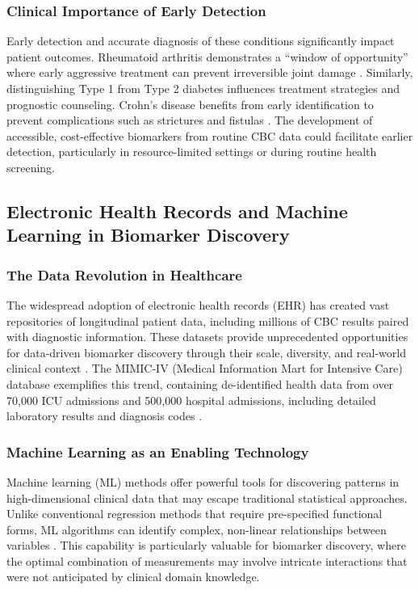 \documentclass[12pt,a4paper]{article}
\begin{document}
\subsubsection{Clinical Importance of Early Detection}

Early detection and accurate diagnosis of these conditions significantly impact patient outcomes. Rheumatoid arthritis demonstrates a ``window of opportunity'' where early aggressive treatment can prevent irreversible joint damage \cite{ref14,ref25}. Similarly, distinguishing Type 1 from Type 2 diabetes influences treatment strategies and prognostic counseling. Crohn's disease benefits from early identification to prevent complications such as strictures and fistulas \cite{ref16}. The development of accessible, cost-effective biomarkers from routine CBC data could facilitate earlier detection, particularly in resource-limited settings or during routine health screening.

\subsection{Electronic Health Records and Machine Learning in Biomarker Discovery}

\subsubsection{The Data Revolution in Healthcare}

The widespread adoption of electronic health records (EHR) has created vast repositories of longitudinal patient data, including millions of CBC results paired with diagnostic information. These datasets provide unprecedented opportunities for data-driven biomarker discovery through their scale, diversity, and real-world clinical context \cite{ref11}. The MIMIC-IV (Medical Information Mart for Intensive Care) database exemplifies this trend, containing de-identified health data from over 70,000 ICU admissions and 500,000 hospital admissions, including detailed laboratory results and diagnosis codes \cite{ref11}.

\subsubsection{Machine Learning as an Enabling Technology}

Machine learning (ML) methods offer powerful tools for discovering patterns in high-dimensional clinical data that may escape traditional statistical approaches. Unlike conventional regression methods that require pre-specified functional forms, ML algorithms can identify complex, non-linear relationships between variables \cite{ref21,ref22,ref23}. This capability is particularly valuable for biomarker discovery, where the optimal combination of measurements may involve intricate interactions that were not anticipated by clinical domain knowledge.
\end{document}

